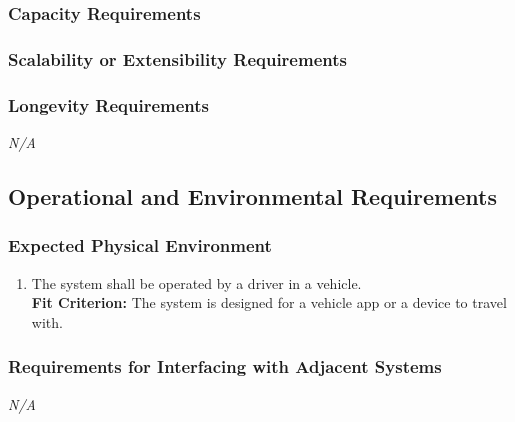 \documentclass[12pt,letterpaper]{article}
\begin{document}
\subsubsection{Capacity Requirements}
\begin{enumerate}[resume*] 
\end{enumerate}

\subsubsection{Scalability or Extensibility Requirements}
\begin{enumerate}[resume*] 
    \color{black}
\end{enumerate}

\subsubsection{Longevity Requirements}
\noindent \emph{N/A}

\subsection{Operational and Environmental Requirements}
\subsubsection{Expected Physical Environment}
\begin{enumerate}[{OE}1.] 
    \item The system shall be operated by a driver in a vehicle. \label{pocnf4}
    \\
    \textbf{Fit Criterion:} The system is designed for a vehicle app or a device
    to travel with.
\end{enumerate}

\subsubsection{Requirements for Interfacing with Adjacent Systems}
\noindent \emph{N/A}
\end{document}
